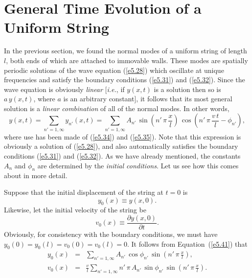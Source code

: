 \section{General Time Evolution of a Uniform String}\label{s5.3}
In the previous section, we found the normal modes of a uniform string of length $l$, both ends of
which are attached to immovable walls. These modes are spatially periodic solutions of the
wave equation (\ref{e5.28}) which oscillate at unique frequencies and
satisfy the boundary conditions (\ref{e5.31}) and (\ref{e5.32}). Since the wave equation is obviously {\em linear}\/ [{\em i.e.},
if $y(x,t)$ is a solution then so is $a\,y(x,t)$, where $a$ is an arbitrary constant], 
it follows that its most general solution is a {\em linear combination}\/ of all of the normal modes. 
In other words, 
\begin{equation}\label{e5.41}
y(x,t) = \sum_{n'=1,\infty}y_{n'}(x,t) = \sum_{n'=1,\infty} A_{n'}\,\sin\left(n'\,\pi\,\frac{x}{l}\right)\,\cos\left(n'\,\pi\,\frac{v\,t}{l}-\phi_{n'}\right),
\end{equation}
where use has been made of (\ref{e5.34}) and (\ref{e5.35}).
Note that this expression is obviously a solution of (\ref{e5.28}), and also
automatically satisfies the boundary conditions (\ref{e5.31}) and (\ref{e5.32}).
As we have already mentioned, the constants $A_n$ and $\phi_n$ are determined
by the {\em initial conditions}. Let us see how this comes about in more detail.

Suppose that the initial displacement of the string at $t=0$ is
\begin{equation}
y_0(x) \equiv y(x,0).
\end{equation}
Likewise, let the initial velocity of the string be
\begin{equation}
v_0(x) \equiv \frac{\partial y(x,0)}{\partial t}.
\end{equation}
Obviously, for consistency with the boundary conditions, we must have
$y_0(0)=y_0(l)=v_0(0)=v_0(l)=0$. 
It follows from Equation~(\ref{e5.41}) that
\begin{eqnarray}
y_0(x) &=& \sum_{n'=1,\infty} A_{n'}\,\cos\phi_{n'}\,\sin\left(n'\,\pi\,\frac{x}{l}\right)\label{e5.44},\\[0.5ex]
v_0(x) &=& \frac{v}{l}\sum_{n'=1,\infty} n'\,\pi\,A_{n'}\,\sin\phi_{n'}\,\sin\left(n'\,\pi\,\frac{x}{l}\right).\label{e5.45}
\end{eqnarray}

